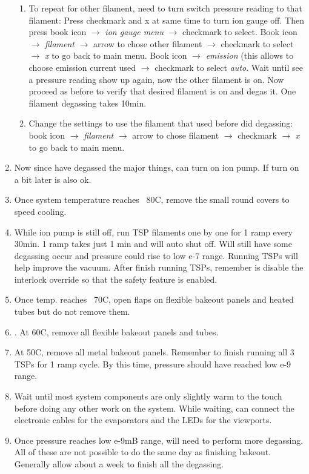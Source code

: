 \begin{enumerate}
\begin{enumerate}
\item	To repeat for other filament, need to turn switch pressure reading to that filament: Press checkmark and x at same time to turn ion gauge off. Then press book icon $\rightarrow$ \emph{ion gauge menu} $\rightarrow$ checkmark to select. Book icon $\rightarrow$ \emph{filament} $\rightarrow$ arrow to chose other filament $\rightarrow$ checkmark to select $\rightarrow$ \emph{x} to go back to main menu. Book icon $\rightarrow$  \emph{emission} (this allows to choose emission current used $\rightarrow$ checkmark to select \emph{auto}. Wait until see a pressure reading show up again, now the other filament is on. Now proceed as before to verify that desired filament is on and degas it. One filament degassing takes 10min. 
\item	Change the settings to use the filament that used before did degassing: book icon $\rightarrow$ \emph{filament} $\rightarrow$ arrow to chose filament $\rightarrow$ checkmark $\rightarrow$ \emph{x} to go back to main menu.
\end{enumerate}
\item	Now since have degassed the major things, can turn on ion pump. If turn on a bit later is also ok.
\item	Once system temperature reaches ~80C, remove the small round covers to speed cooling.
\item	While ion pump is still off, run TSP filaments one by one for 1 ramp every 30min. 1 ramp takes just 1 min and will auto shut off. Will still have some degassing occur and pressure could rise to low e-7 range. Running TSPs will help improve the vacuum. After finish running TSPs, remember is disable the interlock override so that the safety feature is enabled.
\item	Once temp. reaches ~70C, open flaps on flexible bakeout panels and heated tubes but do not remove them.
\item.	At 60C, remove all flexible bakeout panels and tubes.
\item	At 50C, remove all metal bakeout panels.  Remember to finish running all 3 TSPs for 1 ramp cycle. By this time, pressure should have reached low e-9 range.
\item	Wait until most system components are only slightly warm to the touch before doing any other work on the system. While waiting, can connect the electronic cables for the evaporators and the LEDs for the viewports.
\item	Once pressure reaches low e-9mB range, will need to perform more degassing. All of these are not possible to do the same day as finishing bakeout. Generally allow about a week to finish all the degassing.

\end{enumerate}
